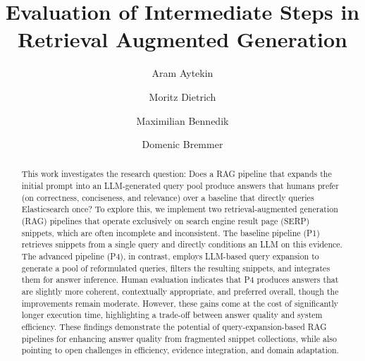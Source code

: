 \documentclass[manuscript,screen]{acmart}
\begin{document}
\title{Evaluation of Intermediate Steps in Retrieval Augmented Generation}

\author{Aram Aytekin}

\author{Moritz Dietrich}

\author{Maximilian Bennedik}

\author{Domenic Bremmer}


\renewcommand{\shortauthors}{Bremmer et al.}

\begin{abstract}
This work investigates the research question: Does a RAG pipeline that expands the initial prompt into an LLM-generated query pool produce answers that humans prefer (on correctness, conciseness, and relevance) over a baseline that directly queries Elasticsearch once? To explore this, we implement two retrieval-augmented generation (RAG) pipelines that operate exclusively on search engine result page (SERP) snippets, which are often incomplete and inconsistent. The baseline pipeline (P1) retrieves snippets from a single query and directly conditions an LLM on this evidence. The advanced pipeline (P4), in contrast, employs LLM-based query expansion to generate a pool of reformulated queries, filters the resulting snippets, and integrates them for answer inference. Human evaluation indicates that P4 produces answers that are slightly more coherent, contextually appropriate, and preferred overall, though the improvements remain moderate. However, these gains come at the cost of significantly longer execution time, highlighting a trade-off between answer quality and system efficiency. These findings demonstrate the potential of query-expansion-based RAG pipelines for enhancing answer quality from fragmented snippet collections, while also pointing to open challenges in efficiency, evidence integration, and domain adaptation.
\end{abstract}
\end{document}
